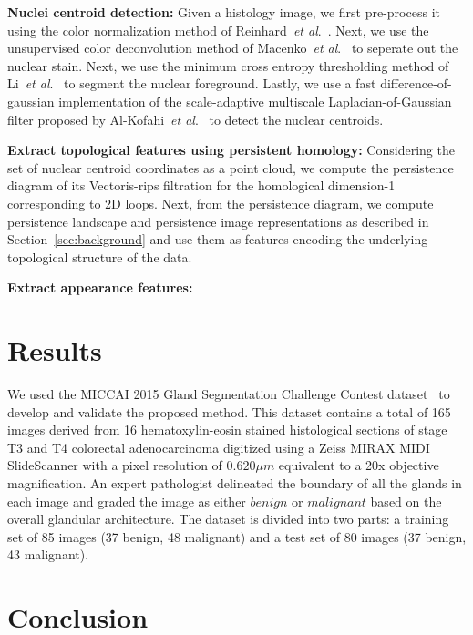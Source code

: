 \documentclass{article}
\newcommand{\etal}{~\textit{et al}.}
\begin{document}
\noindent \textbf{Nuclei centroid detection:} Given a histology image, we first pre-process it using the color normalization method of Reinhard\etal~\cite{Reinhard2001}. Next, we use the unsupervised color deconvolution method of Macenko\etal~\cite{Macenko2009} to seperate out the nuclear stain. Next, we use the minimum cross entropy thresholding method of Li\etal~\cite{Li1998} to segment the nuclear foreground. Lastly, we use a fast difference-of-gaussian implementation of the scale-adaptive multiscale Laplacian-of-Gaussian filter proposed by Al-Kofahi\etal~\cite{Al-Kofahi2010} to detect the nuclear centroids. 

\noindent \textbf{Extract topological features using persistent homology:} Considering the set of nuclear centroid coordinates as a point cloud, we compute the persistence diagram of its Vectoris-rips filtration for the homological dimension-1 corresponding to 2D loops. Next, from the persistence diagram, we compute persistence landscape and persistence image representations as described in Section~\ref{sec:background} and use them as features encoding the underlying topological structure of the data. 

\noindent \textbf{Extract appearance features:}

\section{Results}
\label{sec:results}
We used the MICCAI 2015 Gland Segmentation Challenge Contest dataset~\cite{Sirinukunwattana2017} to develop and validate the proposed method. This dataset contains a total of 165 images derived from 16 hematoxylin-eosin stained histological sections of stage T3 and T4 colorectal adenocarcinoma digitized using a Zeiss MIRAX MIDI SlideScanner with a pixel resolution of $0.620 \mu m$ equivalent to a 20x objective magnification. An expert pathologist delineated the boundary of all the glands in each image and graded the image as either $benign$ or $malignant$ based on the overall glandular architecture. The dataset is divided into two parts: a training set of 85 images (37 benign, 48 malignant) and a test set of 80 images (37 benign, 43 malignant).

\section{Conclusion}
\label{sec:conclusion}



\end{document}
